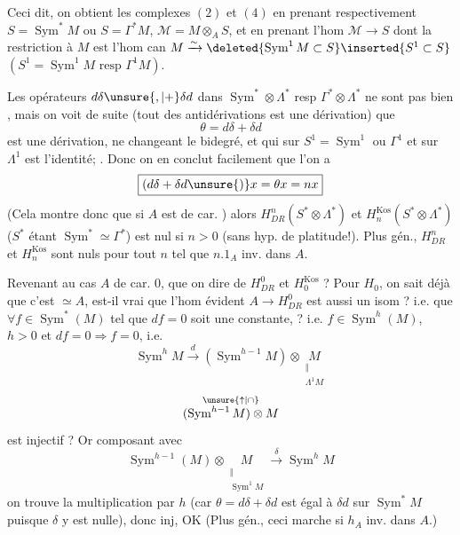 Ceci dit, on obtient les complexes $(2)$ et $(4)$ en prenant respectivement $S=\operatorname{Sym}^*M$ ou $S=\Gamma^*M$, $\mathcal M=M\otimes_A S$, et en prenant l'hom $\mathcal M\longrightarrow S$  dont la restriction à $M$ est l'hom can $M\xrightarrow{\sim}\deleted{\operatorname{Sym}^1M\subset S}\inserted{S^1\subset S}$  $(S^1=\operatorname{Sym}^1M\text{ resp }\Gamma^1M)$.

Les opérateurs $d\delta\unsure{,|+}\delta d$ dans $\operatorname{Sym}^*\otimes\Lambda^*$ resp $\Gamma^*\otimes\Lambda^*$ ne sont pas bien , mais on voit de suite (tout  des antidérivations est une dérivation) que
\[
\theta=d\delta+\delta d
\]
est une dérivation,   ne changeant  le bidegré, et qui sur  $S^1=\operatorname{Sym}^1$ ou $\Gamma^1$ et sur $\Lambda^1$ est l'identité; . Donc on en conclut facilement que l'on a
\[
\boxed{(d\delta+\delta d\unsure{)}x=\theta x=nx}
\]
(Cela montre donc que si $A$ est de car. ) alors $H^n_{DR}(S^*\otimes\Lambda^*)$ et $H_n^{\mathrm{Kos}}(S^*\otimes\Lambda^*)$ ($S^*$ étant $\operatorname{Sym}^*\simeq\Gamma^*$) est nul si  $n>0$ (sans hyp. de platitude!). Plus gén., $H^n_{DR}$ et $H_n^{\mathrm{Kos}}$ sont nuls pour tout $n$ tel que $n.1_A$ inv. dans $A$.

Revenant au cas $A$ de car. $0$, que  on dire de $H^0_{DR}$ et $H_0^{\mathrm{Kos}}$ ? Pour $H_0$, on sait déjà que c'est $\simeq A$, est-il vrai que l'hom évident $A\longrightarrow H^0_{DR}$ est aussi un isom ?  i.e. que $\forall f\in\operatorname{Sym}^*(M)$ tel que $df=0$ soit  une constante, ? i.e.  $f\in\operatorname{Sym}^h(M)$, $h>0$ et $df=0\Longrightarrow f=0$, i.e.
\[
\operatorname{Sym}^hM\xrightarrow{d}(\operatorname{Sym}^{h-1}M)\otimes\underset{\substack{\Vert\\\Lambda^1M}}{M}
\]
\[
\overset{\unsure{\uparrow|\cap}}{(\operatorname{Sym}^{h-1}M)\otimes M}
\]
est injectif ? Or composant avec
\[
\operatorname{Sym}^{h-1}(M)\otimes\underset{\substack{\Vert\\\operatorname{Sym}^1M}}{M}\xrightarrow{\delta}\operatorname{Sym}^hM
\]
on trouve la multiplication par $h$ (car $\theta=d\delta+\delta d$ est égal à $\delta d$ sur $\operatorname{Sym}^*M$ puisque $\delta$ y est nulle), donc inj, OK (Plus gén., ceci marche si $h_A$ inv. dans $A$.)

